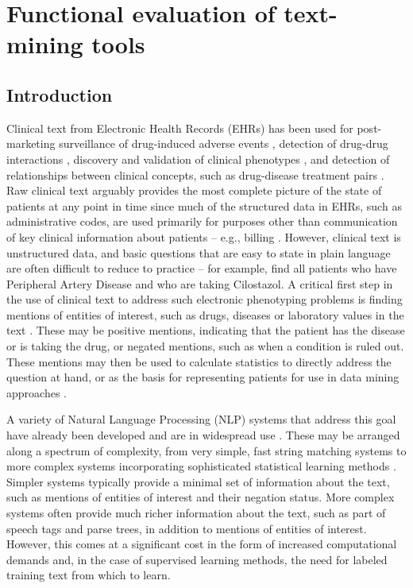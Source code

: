\chapter{Functional evaluation of text-mining tools}
\section{Introduction}
Clinical text from Electronic Health Records (EHRs) has been used for
post-marketing surveillance of drug-induced adverse events
\cite{Harpaz2010,Haerian2012,Wang2009,Friedman2009,Liu2013,Platt2012},
detection of drug-drug interactions \cite{Iyer2013,Duke2012},
discovery and validation of clinical phenotypes
\cite{Lyalina2013,Pathak2013,Davis2013}, and detection of
relationships between clinical concepts, such as drug-disease
treatment pairs
\cite{Jung2014,Chen2008,Zhu2013,deBruijn2011,Patrick2010}.  Raw
clinical text arguably provides the most complete picture of the state
of patients at any point in time since much of the structured data in
EHRs, such as administrative codes, are used primarily for purposes
other than communication of key clinical information about patients –
e.g., billing \cite{Poissant2010,BirmanDeych2005,Carroll2012,Xu2013}.
However, clinical text is unstructured data, and basic questions that
are easy to state in plain language are often difficult to reduce to
practice – for example, find all patients who have Peripheral Artery
Disease and who are taking Cilostazol.  A critical first step in the
use of clinical text to address such electronic phenotyping problems
is finding mentions of entities of interest, such as drugs, diseases
or laboratory values in the text \cite{Boland2013,Bauer2013}.  These
may be positive mentions, indicating that the patient has the disease
or is taking the drug, or negated mentions, such as when a condition
is ruled out.  These mentions may then be used to calculate statistics
to directly address the question at hand, or as the basis for
representing patients for use in data mining approaches
\cite{Boland2013,Bauer2013,Cole2013}.

A variety of Natural Language Processing (NLP) systems that address
this goal have already been developed and are in widespread use
\cite{Chen2004,Davolio2010,Savova2010}.  These may be arranged along a
spectrum of complexity, from very simple, fast string matching systems
to more complex systems incorporating sophisticated statistical
learning methods \cite{Nadkarni2011,Deshmukh2009,Meystre2010}.
Simpler systems typically provide a minimal set of information about
the text, such as mentions of entities of interest and their negation
status.  More complex systems often provide much richer information
about the text, such as part of speech tags and parse trees, in
addition to mentions of entities of interest.  However, this comes at
a significant cost in the form of increased computational demands and,
in the case of supervised learning methods, the need for labeled
training text from which to learn.


